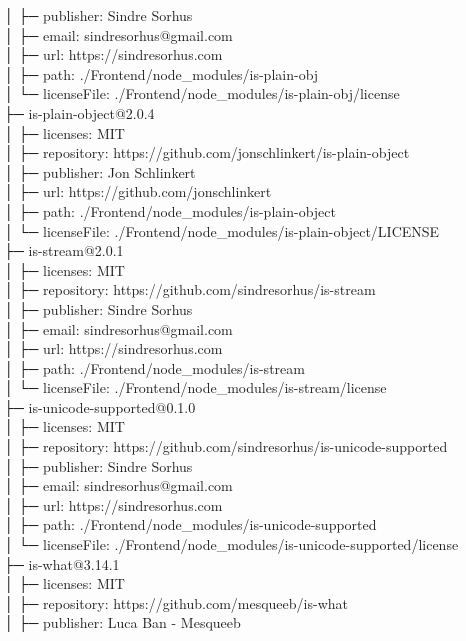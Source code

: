 │  ├─ publisher: Sindre Sorhus\\
│  ├─ email: sindresorhus@gmail.com\\
│  ├─ url: https://sindresorhus.com\\
│  ├─ path: ./Frontend/node\_modules/is-plain-obj\\
│  └─ licenseFile: ./Frontend/node\_modules/is-plain-obj/license\\
├─ is-plain-object@2.0.4\\
│  ├─ licenses: MIT\\
│  ├─ repository: https://github.com/jonschlinkert/is-plain-object\\
│  ├─ publisher: Jon Schlinkert\\
│  ├─ url: https://github.com/jonschlinkert\\
│  ├─ path: ./Frontend/node\_modules/is-plain-object\\
│  └─ licenseFile: ./Frontend/node\_modules/is-plain-object/LICENSE\\
├─ is-stream@2.0.1\\
│  ├─ licenses: MIT\\
│  ├─ repository: https://github.com/sindresorhus/is-stream\\
│  ├─ publisher: Sindre Sorhus\\
│  ├─ email: sindresorhus@gmail.com\\
│  ├─ url: https://sindresorhus.com\\
│  ├─ path: ./Frontend/node\_modules/is-stream\\
│  └─ licenseFile: ./Frontend/node\_modules/is-stream/license\\
├─ is-unicode-supported@0.1.0\\
│  ├─ licenses: MIT\\
│  ├─ repository: https://github.com/sindresorhus/is-unicode-supported\\
│  ├─ publisher: Sindre Sorhus\\
│  ├─ email: sindresorhus@gmail.com\\
│  ├─ url: https://sindresorhus.com\\
│  ├─ path: ./Frontend/node\_modules/is-unicode-supported\\
│  └─ licenseFile: ./Frontend/node\_modules/is-unicode-supported/license\\
├─ is-what@3.14.1\\
│  ├─ licenses: MIT\\
│  ├─ repository: https://github.com/mesqueeb/is-what\\
│  ├─ publisher: Luca Ban - Mesqueeb\\
